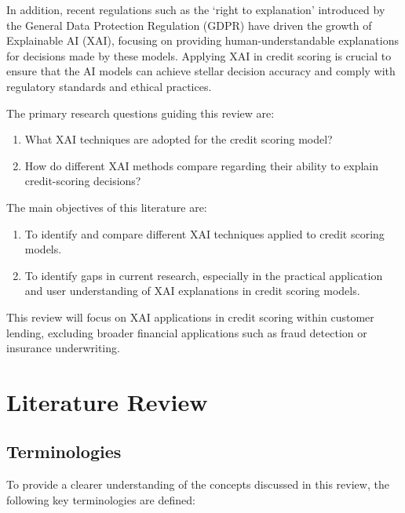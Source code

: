 \documentclass[12pt,a4paper]{article}
\begin{document}
In addition, recent regulations such as the ‘right to explanation’ introduced by the General Data Protection Regulation (GDPR) have driven the growth of Explainable AI (XAI), focusing on providing human-understandable explanations for decisions made by these models. Applying XAI in credit scoring is crucial to ensure that the AI models can achieve stellar decision accuracy and comply with regulatory standards and ethical practices.

The primary research questions guiding this review are:
\vspace{-2em}
\begin{enumerate}[itemsep=-0.5em, label = {RQ\arabic*}] 
\item What XAI techniques are adopted for the credit scoring model?
\item How do different XAI methods compare regarding their ability to explain credit-scoring decisions?
\end{enumerate}


\vspace{-1em}
The main objectives of this literature are:
\vspace{-2em}
\begin{enumerate}[itemsep=-0.5em] 
\item To identify and compare different XAI techniques applied to credit scoring models.
\item To identify gaps in current research, especially in the practical application and user understanding of XAI explanations in credit scoring models.
\end{enumerate}

\vspace{-1em}
This review will focus on XAI applications in credit scoring within customer lending, excluding broader financial applications such as fraud detection or insurance underwriting. 


\section{Literature Review}

\subsection{Terminologies}
\vspace{-1em}

\begingroup
\setlength{\parskip}{0.5em} %
To provide a clearer understanding of the concepts discussed in this review, the following key terminologies are defined:
\end{document}
